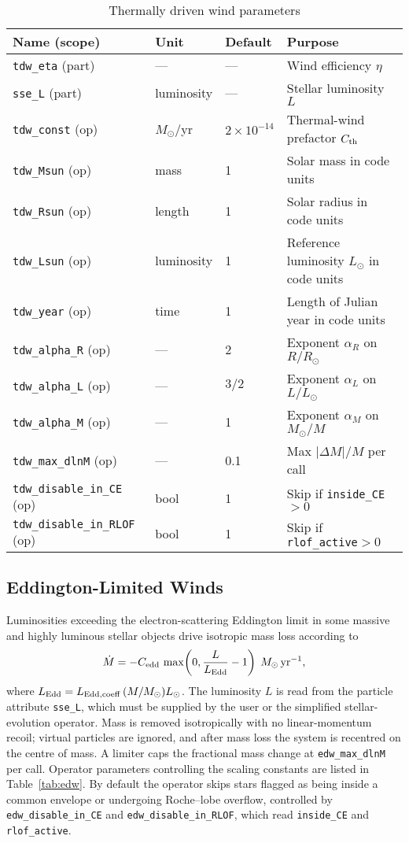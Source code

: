 \documentclass[11pt]{article}
\begin{document}
\begin{table}[h]
\centering\footnotesize
\caption{Thermally driven wind parameters}
\label{tab:tdw}
\begin{tabular}{@{}llll@{}}
\toprule
Name (scope) & Unit & Default & Purpose \\
\midrule
\texttt{tdw\_eta} (part) & — & — & Wind efficiency $\eta$\\
\texttt{sse\_L}   (part) & luminosity & — & Stellar luminosity $L$\\[0.2em]
\texttt{tdw\_const} (op) & $M_\odot$/yr & $2\times10^{-14}$ & Thermal-wind prefactor $C_{\rm th}$\\
\texttt{tdw\_Msun}  (op) & mass & 1 & Solar mass in code units\\
\texttt{tdw\_Rsun}  (op) & length & 1 & Solar radius in code units\\
\texttt{tdw\_Lsun}  (op) & luminosity & 1 & Reference luminosity $L_\odot$ in code units\\
\texttt{tdw\_year}  (op) & time & 1 & Length of Julian year in code units\\
\texttt{tdw\_alpha\_R} (op) & — & 2 & Exponent $\alpha_R$ on $R/R_\odot$\\
\texttt{tdw\_alpha\_L} (op) & — & $3/2$ & Exponent $\alpha_L$ on $L/L_\odot$\\
\texttt{tdw\_alpha\_M} (op) & — & 1 & Exponent $\alpha_M$ on $M_\odot/M$\\
\texttt{tdw\_max\_dlnM} (op) & — & 0.1 & Max $|\Delta M|/M$ per call\\
\texttt{tdw\_disable\_in\_CE} (op) & bool & 1 & Skip if \texttt{inside\_CE}$>0$\\
\texttt{tdw\_disable\_in\_RLOF} (op) & bool & 1 & Skip if \texttt{rlof\_active}$>0$\\
\bottomrule
\end{tabular}
\end{table}

\subsection{Eddington-Limited Winds}
\label{sec:edw}

Luminosities exceeding the electron-scattering Eddington limit in some massive and highly luminous stellar objects drive isotropic
mass loss according to
\[
\dot M = -C_{\rm edd}\,\max\!\left(0,\frac{L}{L_{\rm Edd}}-1\right)
\;M_\odot\,\mathrm{yr}^{-1},
\]
where $L_{\rm Edd} = L_{\rm Edd,coeff}\,(M/M_\odot)L_\odot$. The luminosity $L$
is read from the particle attribute \texttt{sse\_L}, which must be supplied
by the user or the simplified stellar-evolution operator. Mass is removed
isotropically with no linear-momentum recoil; virtual particles are ignored,
and after mass loss the system is recentred on the centre of mass. A limiter
caps the fractional mass change at \texttt{edw\_max\_dlnM} per call. Operator
parameters controlling the scaling constants are listed in
Table~\ref{tab:edw}.
By default the operator skips stars flagged as being inside a common envelope
or undergoing Roche--lobe overflow, controlled by
\texttt{edw\_disable\_in\_CE} and \texttt{edw\_disable\_in\_RLOF}, which read
\texttt{inside\_CE} and \texttt{rlof\_active}.
\end{document}
